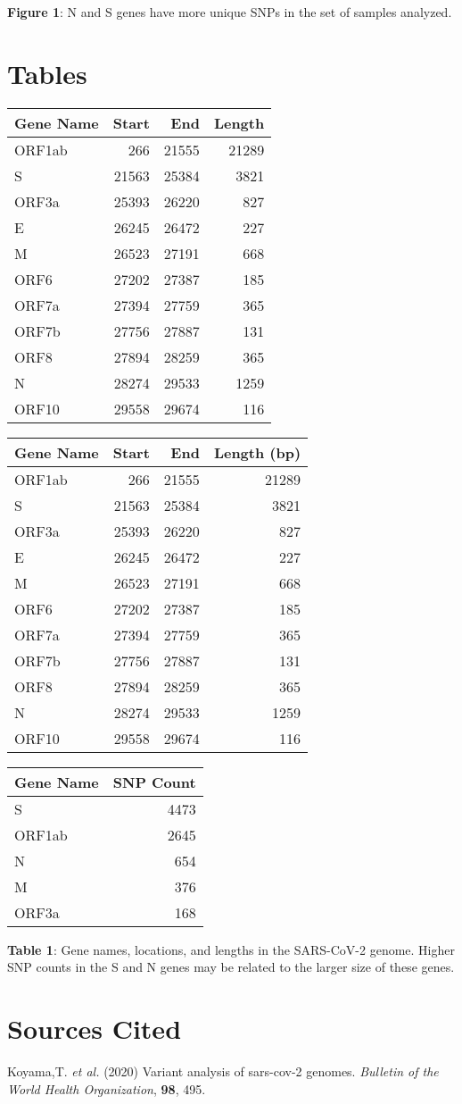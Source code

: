 \documentclass[
]{article}
\begin{document}
\textbf{Figure 1}: N and S genes have more unique SNPs in the set of
samples analyzed.

\hypertarget{tables}{%
\section{Tables}\label{tables}}

\begin{longtable}[]{@{}lrrr@{}}
\toprule
Gene Name & Start & End & Length\tabularnewline
\midrule
\endhead
ORF1ab & 266 & 21555 & 21289\tabularnewline
S & 21563 & 25384 & 3821\tabularnewline
ORF3a & 25393 & 26220 & 827\tabularnewline
E & 26245 & 26472 & 227\tabularnewline
M & 26523 & 27191 & 668\tabularnewline
ORF6 & 27202 & 27387 & 185\tabularnewline
ORF7a & 27394 & 27759 & 365\tabularnewline
ORF7b & 27756 & 27887 & 131\tabularnewline
ORF8 & 27894 & 28259 & 365\tabularnewline
N & 28274 & 29533 & 1259\tabularnewline
ORF10 & 29558 & 29674 & 116\tabularnewline
\bottomrule
\end{longtable}

\begin{longtable}[]{@{}lrrr@{}}
\toprule
Gene Name & Start & End & Length (bp)\tabularnewline
\midrule
\endhead
ORF1ab & 266 & 21555 & 21289\tabularnewline
S & 21563 & 25384 & 3821\tabularnewline
ORF3a & 25393 & 26220 & 827\tabularnewline
E & 26245 & 26472 & 227\tabularnewline
M & 26523 & 27191 & 668\tabularnewline
ORF6 & 27202 & 27387 & 185\tabularnewline
ORF7a & 27394 & 27759 & 365\tabularnewline
ORF7b & 27756 & 27887 & 131\tabularnewline
ORF8 & 27894 & 28259 & 365\tabularnewline
N & 28274 & 29533 & 1259\tabularnewline
ORF10 & 29558 & 29674 & 116\tabularnewline
\bottomrule
\end{longtable}

\begin{longtable}[]{@{}lr@{}}
\toprule
Gene Name & SNP Count\tabularnewline
\midrule
\endhead
S & 4473\tabularnewline
ORF1ab & 2645\tabularnewline
N & 654\tabularnewline
M & 376\tabularnewline
ORF3a & 168\tabularnewline
\bottomrule
\end{longtable}

\textbf{Table 1}: Gene names, locations, and lengths in the SARS-CoV-2
genome. Higher SNP counts in the S and N genes may be related to the
larger size of these genes.

\hypertarget{sources-cited}{%
\section*{Sources Cited}\label{sources-cited}}

\hypertarget{refs}{}
\leavevmode\hypertarget{ref-koyama2020variant}{}%
Koyama,T. \emph{et al.} (2020) Variant analysis of sars-cov-2 genomes.
\emph{Bulletin of the World Health Organization}, \textbf{98}, 495.
\end{document}
